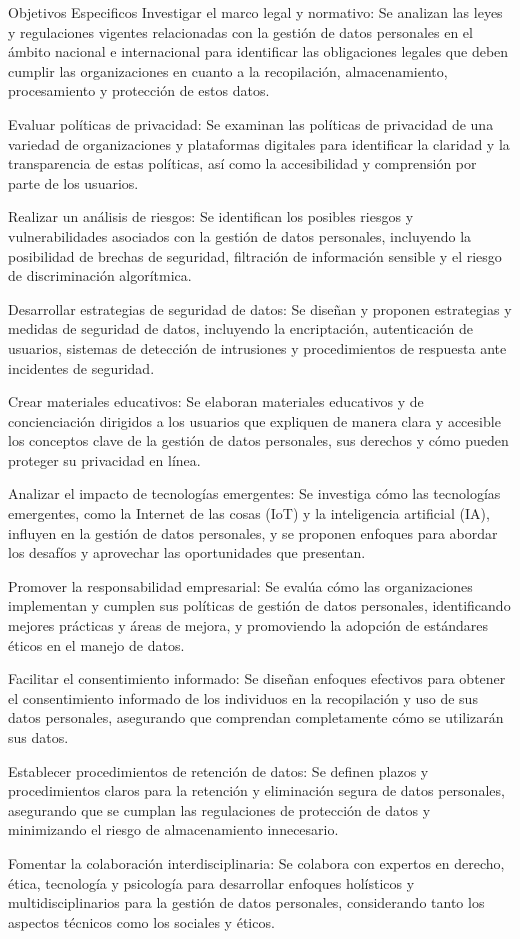 Objetivos Especificos
Investigar el marco legal y normativo: Se analizan las leyes y regulaciones vigentes relacionadas con la gestión de datos personales en el ámbito nacional e internacional para identificar las obligaciones legales que deben cumplir las organizaciones en cuanto a la recopilación, almacenamiento, procesamiento y protección de estos datos.

Evaluar políticas de privacidad: Se examinan las políticas de privacidad de una variedad de organizaciones y plataformas digitales para identificar la claridad y la transparencia de estas políticas, así como la accesibilidad y comprensión por parte de los usuarios.

Realizar un análisis de riesgos: Se identifican los posibles riesgos y vulnerabilidades asociados con la gestión de datos personales, incluyendo la posibilidad de brechas de seguridad, filtración de información sensible y el riesgo de discriminación algorítmica.

Desarrollar estrategias de seguridad de datos: Se diseñan y proponen estrategias y medidas de seguridad de datos, incluyendo la encriptación, autenticación de usuarios, sistemas de detección de intrusiones y procedimientos de respuesta ante incidentes de seguridad.

Crear materiales educativos: Se elaboran materiales educativos y de concienciación dirigidos a los usuarios que expliquen de manera clara y accesible los conceptos clave de la gestión de datos personales, sus derechos y cómo pueden proteger su privacidad en línea.

Analizar el impacto de tecnologías emergentes: Se investiga cómo las tecnologías emergentes, como la Internet de las cosas (IoT) y la inteligencia artificial (IA), influyen en la gestión de datos personales, y se proponen enfoques para abordar los desafíos y aprovechar las oportunidades que presentan.

Promover la responsabilidad empresarial: Se evalúa cómo las organizaciones implementan y cumplen sus políticas de gestión de datos personales, identificando mejores prácticas y áreas de mejora, y promoviendo la adopción de estándares éticos en el manejo de datos.

Facilitar el consentimiento informado: Se diseñan enfoques efectivos para obtener el consentimiento informado de los individuos en la recopilación y uso de sus datos personales, asegurando que comprendan completamente cómo se utilizarán sus datos.

Establecer procedimientos de retención de datos: Se definen plazos y procedimientos claros para la retención y eliminación segura de datos personales, asegurando que se cumplan las regulaciones de protección de datos y minimizando el riesgo de almacenamiento innecesario.

Fomentar la colaboración interdisciplinaria: Se colabora con expertos en derecho, ética, tecnología y psicología para desarrollar enfoques holísticos y multidisciplinarios para la gestión de datos personales, considerando tanto los aspectos técnicos como los sociales y éticos.

